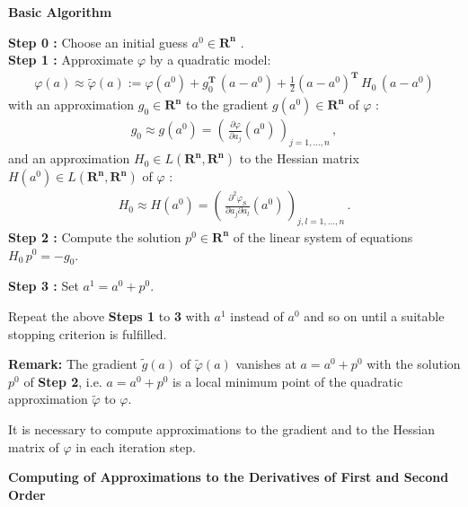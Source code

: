 {\bf Basic Algorithm}
\par
{\bf Step 0 :} Choose an initial guess $a^0 \in \mathbf{R^n}$ .\\
{\bf Step 1 :} Approximate $\varphi$ by a quadratic model:
\begin{eqnarray*}
\varphi(a) \approx \tilde{\varphi}(a):= \varphi(a^0)+g_0^{\mathbf{T}}\,
(a-a^0)+ \frac{1}{2}(a-a^0)^{\mathbf{T}} \, H_0 \, (a-a^0)
\end{eqnarray*}
with an approximation $g_0 \in \mathbf{R^n}$ to the gradient
$g(a^0) \in \mathbf{R^n}$
of $\varphi$ :
\begin{eqnarray*}
g_0 \approx g(a^0)= \left(\, \frac{\partial \varphi}
{\partial a_j}(a^0) \,\right)_{j=1,\ldots,n} \, ,
\end{eqnarray*}
and an approximation $H_0 \in L(\mathbf{R^n},\mathbf{R^n})$ to the
Hessian matrix $H(a^0)  \in L(\mathbf{R^n},\mathbf{R^n})$ of $\varphi$ :
\begin{eqnarray*}
H_0 \approx H(a^0) = \left(\, \frac{\partial^2 \varphi_S}
{\partial a_j \partial a_l} (a^0) \, \right)_{j,l=1,\ldots,n} \, .
\end{eqnarray*}
{\bf Step 2 :}
Compute the solution $p^0 \in \mathbf{R^n}$ of the linear system of
equations \quad $H_0\,p^0 = -g_0$.
\par
{\bf Step 3 :} Set \quad $a^1 = a^0 + p^0$.
\par
Repeat the above {\bf Steps 1} to {\bf 3} with $a^1$ instead of $a^0$
and so on until a suitable stopping criterion is fulfilled.
\par
{\bf Remark:} The gradient $\tilde{g}(a)$ of $\tilde{\varphi}(a)$
vanishes at $a=a^0+p^0$ with the solution $p^0$ of {\bf Step 2},
i.e. $a=a^0+p^0$ is a local minimum point of the quadratic
approximation $\tilde{\varphi}$ to $\varphi$.
\par
It is necessary to compute approximations to the gradient and to the
Hessian matrix of $\varphi$ in each iteration step.
\par
{\bf Computing of Approximations to the Derivatives of First and Second
Order}
